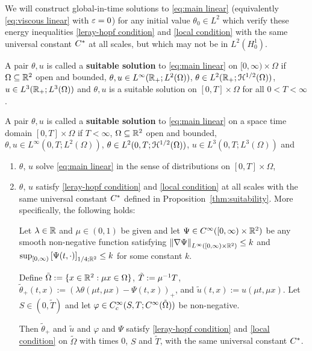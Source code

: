 We will construct global-in-time solutions to \eqref{eq:main linear} (equivalently \eqref{eq:viscous linear} with $\varepsilon = 0$) for any initial value $\theta_0 \in L^2$ which verify these energy inequalities \eqref{leray-hopf condition} and \eqref{local condition} with the same universal constant $C^\ast$ at all scales, but which may not be in $L^2(H_0^1)$.  
\begin{definition}
A pair $\theta, u$ is called a \textbf{suitable solution} to \eqref{eq:main linear} on $[0,\infty) \times \Omega$ if $\Omega \subseteq \mathbb{R}^2$ open and bounded, $\theta,u \in L^\infty(\mathbb{R}_+;L^2(\Omega))$, $\theta \in L^2(\mathbb{R}_+;\mathcal{H}^{1/2}(\Omega))$, $u \in L^3(\mathbb{R}_+; L^3(\Omega))$ and $\theta, u$ is a suitable solution on $[0,T]\times\Omega$ for all $0 < T < \infty$.  

A pair $\theta, u$ is called a \textbf{suitable solution} to \eqref{eq:main linear} on a space time domain $[0,T]\times \Omega$ if $T <\infty$, $\Omega \subseteq\mathbb{R}^2$ open and bounded,  $\theta,u \in L^\infty(0,T;L^2(\Omega))$, $\theta \in L^2(0,T;\mathcal{H}^{1/2}(\Omega))$, $u \in L^3(0,T; L^3(\Omega))$ and
\begin{enumerate}
\item $\theta$, $u$ solve \eqref{eq:main linear} in the sense of distributions on $[0,T]\times\Omega$, \\
\item $\theta$, $u$ satisfy \eqref{leray-hopf condition} and \eqref{local condition} at all scales with the same universal constant $C^\ast$ defined in Proposition~\ref{thm:suitability}.  More specifically, the following holds:

Let $\lambda \in \mathbb{R}$ and $\mu \in (0,1)$ be given and let $\Psi \in C^\infty([0,\infty)\times \mathbb{R}^2)$ be any smooth non-negative function satisfying $\left\lVert\nabla\Psi\right\rVert_{L^\infty([0,\infty)\times\mathbb{R}^2)} \leq k$ and $\sup_{[0,\infty)} \left[ \Psi(t,\cdot) \right]_{1/4; \mathbb{R}^2} \leq k$ for some constant $k$.  

Define $\tilde{\Omega} := \{x \in \mathbb{R}^2: \mu x \in \Omega\}$, $\tilde{T}:= \mu^{-1} T$, $\tilde{\theta}_+(t,x) := (\lambda \theta(\mu t, \mu x)-\Psi(t, x))_+$, and $\tilde{u}(t,x):= u(\mu t, \mu x)$.  Let $S \in (0,\tilde{T})$ and let $\varphi \in C_c^\infty(S,T;C^\infty(\tilde{\Omega}))$ be non-negative.  

Then $\tilde{\theta}_+$ and $\tilde{u}$ and $\varphi$ and $\Psi$ satisfy \eqref{leray-hopf condition} and \eqref{local condition} on $\tilde{\Omega}$ with times 0, $S$ and $\tilde{T}$, with the same universal constant $C^\ast$.  
\end{enumerate}
\end{definition}

